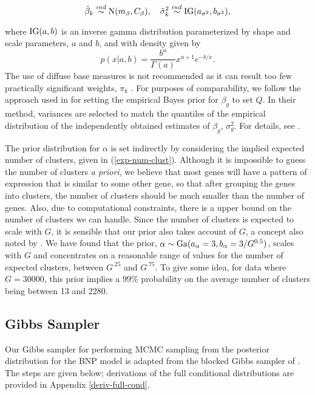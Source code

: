 \begin{equation}
\tilde{\beta}_k \stackrel{ind}{\sim} \operatorname{N}(m_\beta, C_\beta),\quad \tilde{\sigma}^2_k \stackrel{ind}{\sim} \operatorname{IG}(a_{\sigma^2}, b_{\sigma^2}),
\end{equation}

where $\operatorname{IG}(a,b)$ is an inverse gamma distribution parameterized by shape and scale parameters, $a$ and $b$, and with density given by
\begin{equation*}
p(x|a,b) = \frac{b^a}{\Gamma(a)}x^{a+1}e^{-b/x}.
\end{equation*}
The use of diffuse base measures is not recommended as it can result too few practically significant weights, $\pi_k$ \citep[p.554]{gelman-book}. For purposes of comparability, we follow the approach used in \cite{deseq2014} for setting the empirical Bayes prior for $\beta_g$ to set $Q$. In their method, variances are selected to match the quantiles of the empirical distribution of the independently obtained estimates of $\beta_g$, $\sigma_g^2$. For details, see \citet{deseq2014}.

The prior distribution for $\alpha$ is set indirectly by considering the implied expected number of clusters, given in (\ref{exp-num-clust}). Although it is impossible to guess the number of clusters \textit{a priori}, we believe that most genes will have a pattern of expression that is similar to some other gene, so that after grouping the genes into clusters, the number of clusters should be much smaller than the number of genes. Also, due to computational constraints, there is a upper bound on the number of clusters we can handle. Since the number of clusters is expected to scale with $G$, it is sensible that our prior also takes account of $G$, a concept also noted by \citet{escobar1994}. We have found that the prior, $\alpha \sim \operatorname{Ga}(a_\alpha=3,b_\alpha=3/G^{0.5})$, scales with $G$ and concentrates on a reasonable range of values for the number of expected clusters, between $G^{.25}$ and $G^{.75}$. To give some idea, for data where $G=30000$, this prior implies a 99\% probability on the average number of clusters being between 13 and 2280.


\subsection{Gibbs Sampler}
Our Gibbs sampler for performing MCMC sampling from the posterior distribution for the BNP model is adapted from the blocked Gibbs sampler of \citet{ishwaran2000}. The steps are given below; derivations of the full conditional distributions are provided in Appendix \ref{deriv-full-cond}.

